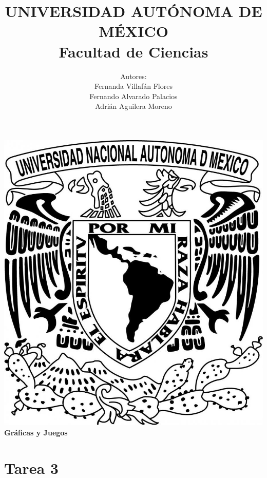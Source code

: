 \documentclass{article}
\begin{document}
\title{UNIVERSIDAD AUT\'ONOMA DE M\'EXICO\\ Facultad de Ciencias}
\author{Autores:
  \\ Fernanda Villaf\'an Flores
  \\ Fernando Alvarado Palacios
  \\ Adri\'an Aguilera Moreno}
\date{}
\maketitle
\begin{center}
  \includegraphics[scale=0.20]{../Imagen/Portada.jpg}\\[0.4cm]
  \Large
  \bf{Gr\'aficas y Juegos}
  \normalsize
\end{center}
\newpage
{}
\section*{\LARGE{Tarea 3}}
\end{document}
